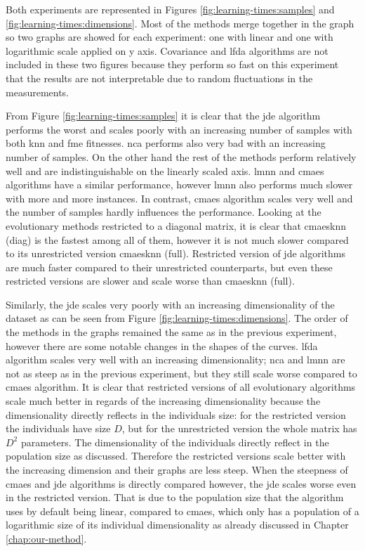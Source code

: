 \documentclass[12pt,a4paper]{report}
\begin{document}
Both experiments are represented in Figures \ref{fig:learning-times:samples} and \ref{fig:learning-times:dimensions}. Most of the methods merge together in the graph so two graphs are showed for each experiment: one with linear and one with logarithmic scale applied on y axis. Covariance and \ac{lfda} algorithms are not included in these two figures because they perform so fast on this experiment that the results are not interpretable due to random fluctuations in the measurements.

From Figure \ref{fig:learning-times:samples} it is clear that the \ac{jde} algorithm performs the worst and scales poorly with an increasing number of samples with both \ac{knn} and \ac{fme} fitnesses. \ac{nca} performs also very bad with an increasing number of samples. On the other hand the rest of the methods perform relatively well and are indistinguishable on the linearly scaled axis. \ac{lmnn} and \ac{cmaes} algorithms have a similar performance, however \ac{lmnn} also performs much slower with more and more instances. In contrast, \ac{cmaes} algorithm scales very well and the number of samples hardly influences the performance. Looking at the evolutionary methods restricted to a diagonal matrix, it is clear that \ac{cmaesknn} (diag) is the fastest among all of them, however it is not much slower compared to its unrestricted version \ac{cmaesknn} (full). Restricted version of \ac{jde} algorithms are much faster compared to their unrestricted counterparts, but even these restricted versions are slower and scale worse than \ac{cmaesknn} (full).


Similarly, the \ac{jde} scales very poorly with an increasing dimensionality of the dataset as can be seen from Figure \ref{fig:learning-times:dimensions}. The order of the methods in the graphs remained the same as in the previous experiment, however there are some notable changes in the shapes of the curves. \ac{lfda} algorithm scales very well with an increasing dimensionality; \ac{nca} and \ac{lmnn} are not as steep as in the previous experiment, but they still scale worse compared to \ac{cmaes} algorithm. It is clear that restricted versions of all evolutionary algorithms scale much better in regards of the increasing dimensionality because the dimensionality directly reflects in the individuals size: for the restricted version the individuals have size $D$, but for the unrestricted version the whole matrix has $D^2$ parameters. The dimensionality of the individuals directly reflect in the population size as discussed. Therefore the restricted versions scale better with the increasing dimension and their graphs are less steep. When the steepness of \ac{cmaes} and \ac{jde} algorithms is directly compared however, the \ac{jde} scales worse even in the restricted version. That is due to the population size that the algorithm uses by default being linear, compared to \ac{cmaes}, which only has a population of a logarithmic size of its individual dimensionality as already discussed in Chapter \ref{chap:our-method}.
\end{document}
